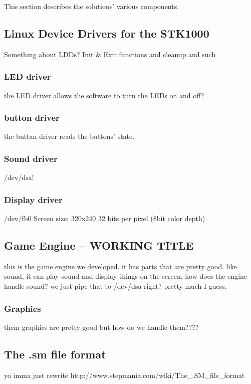 This section describes the solutions' various components.

\subsection{Linux Device Drivers for the STK1000}
	Something about LDDs?
	Init & Exit functions and cleanup and such

	\subsubsection{LED driver}
		the LED driver allows the software to turn the LEDs on and off?
	\subsubsection{button driver}
		the buttan driver reads the buttons' state.	

	\subsubsection{Sound driver}
		/dev/dsa!
	\subsubsection{Display driver}
		/dev/fb0
		Screen size: 320x240
		32 bits per pixel (8bit color depth)

\subsection{Game Engine -- WORKING TITLE}
	this is the game engine we developed. it has parts that are pretty good. like sound, it can play sound and display things on the screen.
		how does the engine handle sound?
		we just pipe that to /dev/dsa right?
		pretty much I guess.
	\subsubsection{Graphics}
		them graphics are pretty good but how do we handle them????

\subsection{The .sm file format}
	yo imma just rewrite http://www.stepmania.com/wiki/The_.SM_file_format